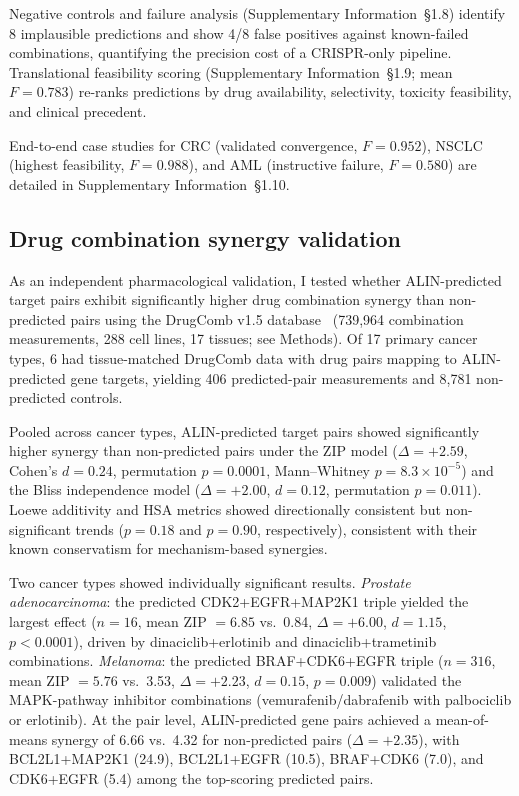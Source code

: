 \documentclass[times, twoside, watermark]{zHenriquesLab-StyleBioRxiv}
\begin{document}
Negative controls and failure analysis (Supplementary Information~\S1.8) identify 8 implausible predictions and show 4/8 false positives against known-failed combinations, quantifying the precision cost of a CRISPR-only pipeline. Translational feasibility scoring (Supplementary Information~\S1.9; mean $F = 0.783$) re-ranks predictions by drug availability, selectivity, toxicity feasibility, and clinical precedent.

End-to-end case studies for CRC (validated convergence, $F = 0.952$), NSCLC (highest feasibility, $F = 0.988$), and AML (instructive failure, $F = 0.580$) are detailed in Supplementary Information~\S1.10.

\subsection*{Drug combination synergy validation}
As an independent pharmacological validation, I tested whether ALIN-predicted target pairs exhibit significantly higher drug combination synergy than non-predicted pairs using the DrugComb v1.5 database~\cite{Zagidullin2019,Zheng2022} (739{,}964 combination measurements, 288 cell lines, 17 tissues; see Methods). Of 17 primary cancer types, 6 had tissue-matched DrugComb data with drug pairs mapping to ALIN-predicted gene targets, yielding 406 predicted-pair measurements and 8{,}781 non-predicted controls.

Pooled across cancer types, ALIN-predicted target pairs showed significantly higher synergy than non-predicted pairs under the ZIP model ($\Delta = +2.59$, Cohen's $d = 0.24$, permutation $p = 0.0001$, Mann--Whitney $p = 8.3 \times 10^{-5}$) and the Bliss independence model ($\Delta = +2.00$, $d = 0.12$, permutation $p = 0.011$). Loewe additivity and HSA metrics showed directionally consistent but non-significant trends ($p = 0.18$ and $p = 0.90$, respectively), consistent with their known conservatism for mechanism-based synergies.

Two cancer types showed individually significant results. \emph{Prostate adenocarcinoma}: the predicted CDK2+EGFR+MAP2K1 triple yielded the largest effect ($n = 16$, mean ZIP $= 6.85$ vs.\ 0.84, $\Delta = +6.00$, $d = 1.15$, $p < 0.0001$), driven by dinaciclib+erlotinib and dinaciclib+trametinib combinations. \emph{Melanoma}: the predicted BRAF+CDK6+EGFR triple ($n = 316$, mean ZIP $= 5.76$ vs.\ 3.53, $\Delta = +2.23$, $d = 0.15$, $p = 0.009$) validated the MAPK-pathway inhibitor combinations (vemurafenib/dabrafenib with palbociclib or erlotinib). At the pair level, ALIN-predicted gene pairs achieved a mean-of-means synergy of 6.66 vs.\ 4.32 for non-predicted pairs ($\Delta = +2.35$), with BCL2L1+MAP2K1 (24.9), BCL2L1+EGFR (10.5), BRAF+CDK6 (7.0), and CDK6+EGFR (5.4) among the top-scoring predicted pairs.
\end{document}
